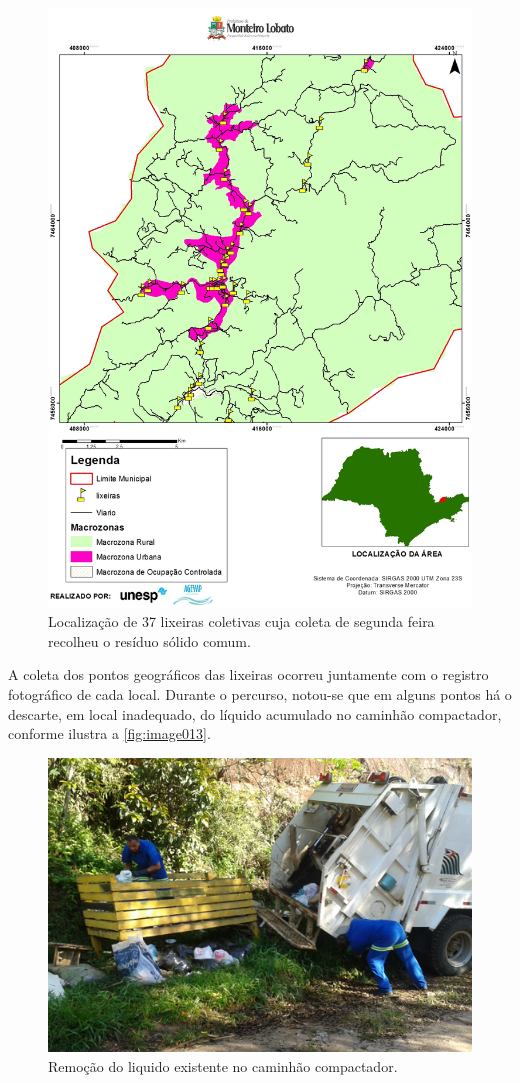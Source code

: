 \begin{figure}
	\centering
	\includegraphics[width=1\linewidth]{produtos/prodtres/image012}
	\caption{Localização de 37 lixeiras coletivas cuja coleta de segunda feira recolheu o resíduo sólido comum.}
	\label{fig:image012}
\end{figure}

A coleta dos pontos geográficos das lixeiras ocorreu juntamente com o registro fotográfico de cada local.  Durante o percurso, notou-se que em alguns pontos há o descarte, em local inadequado, do líquido acumulado no caminhão compactador, conforme ilustra a \autoref{fig:image013}.

\begin{figure}
	\centering
	\includegraphics[width=0.7\linewidth]{produtos/prodtres/image013}
	\caption{Remoção do liquido existente no caminhão compactador.}
	\label{fig:image013}
\end{figure}


